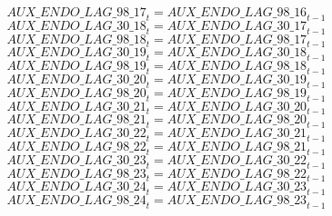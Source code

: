 \begin{dmath}
{AUX\_ENDO\_LAG\_98\_17}_{t}={AUX\_ENDO\_LAG\_98\_16}_{t-1}
\end{dmath}
\begin{dmath}
{AUX\_ENDO\_LAG\_30\_18}_{t}={AUX\_ENDO\_LAG\_30\_17}_{t-1}
\end{dmath}
\begin{dmath}
{AUX\_ENDO\_LAG\_98\_18}_{t}={AUX\_ENDO\_LAG\_98\_17}_{t-1}
\end{dmath}
\begin{dmath}
{AUX\_ENDO\_LAG\_30\_19}_{t}={AUX\_ENDO\_LAG\_30\_18}_{t-1}
\end{dmath}
\begin{dmath}
{AUX\_ENDO\_LAG\_98\_19}_{t}={AUX\_ENDO\_LAG\_98\_18}_{t-1}
\end{dmath}
\begin{dmath}
{AUX\_ENDO\_LAG\_30\_20}_{t}={AUX\_ENDO\_LAG\_30\_19}_{t-1}
\end{dmath}
\begin{dmath}
{AUX\_ENDO\_LAG\_98\_20}_{t}={AUX\_ENDO\_LAG\_98\_19}_{t-1}
\end{dmath}
\begin{dmath}
{AUX\_ENDO\_LAG\_30\_21}_{t}={AUX\_ENDO\_LAG\_30\_20}_{t-1}
\end{dmath}
\begin{dmath}
{AUX\_ENDO\_LAG\_98\_21}_{t}={AUX\_ENDO\_LAG\_98\_20}_{t-1}
\end{dmath}
\begin{dmath}
{AUX\_ENDO\_LAG\_30\_22}_{t}={AUX\_ENDO\_LAG\_30\_21}_{t-1}
\end{dmath}
\begin{dmath}
{AUX\_ENDO\_LAG\_98\_22}_{t}={AUX\_ENDO\_LAG\_98\_21}_{t-1}
\end{dmath}
\begin{dmath}
{AUX\_ENDO\_LAG\_30\_23}_{t}={AUX\_ENDO\_LAG\_30\_22}_{t-1}
\end{dmath}
\begin{dmath}
{AUX\_ENDO\_LAG\_98\_23}_{t}={AUX\_ENDO\_LAG\_98\_22}_{t-1}
\end{dmath}
\begin{dmath}
{AUX\_ENDO\_LAG\_30\_24}_{t}={AUX\_ENDO\_LAG\_30\_23}_{t-1}
\end{dmath}
\begin{dmath}
{AUX\_ENDO\_LAG\_98\_24}_{t}={AUX\_ENDO\_LAG\_98\_23}_{t-1}
\end{dmath}
